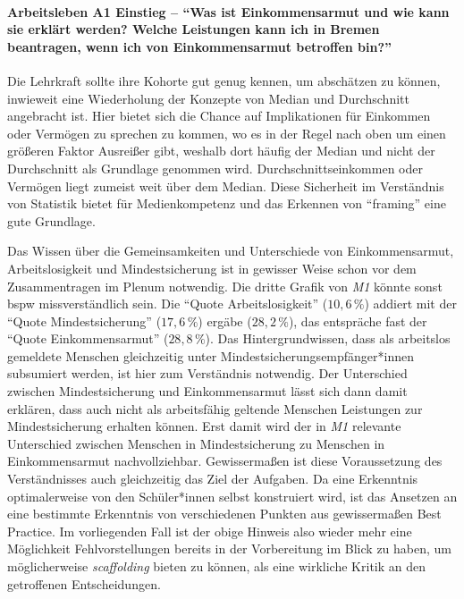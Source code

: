 \paragraph{Arbeitsleben A1 Einstieg -- \enquote{Was ist Einkommensarmut und wie kann sie erklärt werden? Welche Leistungen kann ich in Bremen beantragen, wenn ich von Einkommensarmut betroffen bin?}}
Die Lehrkraft sollte ihre Kohorte gut genug kennen, um abschätzen zu können, inwieweit eine Wiederholung der Konzepte von Median und Durchschnitt angebracht ist. Hier bietet sich die Chance auf Implikationen für Einkommen oder Vermögen zu sprechen zu kommen, wo es in der Regel nach oben um einen größeren Faktor Ausreißer gibt, weshalb dort häufig der Median und nicht der Durchschnitt als Grundlage genommen wird. Durchschnittseinkommen oder Vermögen liegt zumeist weit über dem Median. Diese Sicherheit im Verständnis von Statistik bietet für Medienkompetenz und das Erkennen von \enquote{framing} eine gute Grundlage.

Das Wissen über die Gemeinsamkeiten und Unterschiede von Einkommensarmut, Arbeitslosigkeit und Mindestsicherung ist in gewisser Weise schon vor dem Zusammentragen im Plenum notwendig. 
Die dritte Grafik von \emph{M1} könnte sonst \gls{bspw} missverständlich sein. Die \enquote{Quote Arbeitslosigkeit} ($10,6\,\%$) addiert mit der \enquote{Quote Mindestsicherung} ($17,6\,\%$) ergäbe ($28,2\,\%$), das entspräche fast der \enquote{Quote Einkommensarmut} ($28,8\,\%$). Das Hintergrundwissen, dass als arbeitslos gemeldete Menschen gleichzeitig unter Mindestsicherungsempfänger*innen subsumiert werden, ist hier zum Verständnis notwendig. Der Unterschied zwischen Mindestsicherung und Einkommensarmut lässt sich dann damit erklären, dass auch nicht als arbeitsfähig geltende Menschen Leistungen zur Mindestsicherung erhalten können. Erst damit wird der in \emph{M1} relevante Unterschied zwischen Menschen in Mindestsicherung zu Menschen in Einkommensarmut nachvollziehbar. Gewissermaßen ist diese Voraussetzung des Verständnisses auch gleichzeitig das Ziel der Aufgaben. Da eine Erkenntnis optimalerweise von den Schüler*innen selbst konstruiert wird, ist das Ansetzen an eine bestimmte Erkenntnis von verschiedenen Punkten aus gewissermaßen Best Practice. Im vorliegenden Fall ist der obige Hinweis also wieder mehr eine Möglichkeit Fehlvorstellungen bereits in der Vorbereitung im Blick zu haben, um möglicherweise \emph{scaffolding} bieten zu können, als eine wirkliche Kritik an den getroffenen Entscheidungen. 

